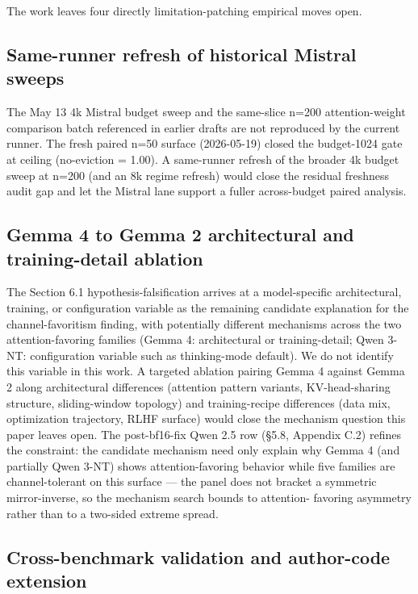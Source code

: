 \documentclass[10pt]{article}
\begin{document}
The work leaves four directly limitation-patching empirical moves open.

\subsection{Same-runner refresh of historical Mistral sweeps}\label{81-same-runner-refresh-of-historical-mistral-sweeps}

The May 13 4k Mistral budget sweep and the same-slice n=200
attention-weight comparison batch referenced in earlier drafts are not
reproduced by the current runner. The fresh paired n=50 surface
(2026-05-19) closed the budget-1024 gate at ceiling (no-eviction = 1.00).
A same-runner refresh of the broader 4k budget sweep at n=200 (and an
8k regime refresh) would close the residual freshness audit gap and let
the Mistral lane support a fuller across-budget paired analysis.

\subsection{Gemma 4 to Gemma 2 architectural and training-detail ablation}\label{82-gemma-4-to-gemma-2-architectural-and-training-detail-ablation}

The Section 6.1 hypothesis-falsification arrives at a model-specific
architectural, training, or configuration variable as the remaining
candidate explanation for the channel-favoritism finding, with
potentially different mechanisms across the two attention-favoring
families (Gemma 4: architectural or training-detail; Qwen 3-NT:
configuration variable such as thinking-mode default). We do not identify this
variable in this work. A targeted ablation pairing Gemma 4 against Gemma
2 along architectural differences (attention pattern variants,
KV-head-sharing structure, sliding-window topology) and training-recipe
differences (data mix, optimization trajectory, RLHF surface) would
close the mechanism question this paper leaves open. The post-bf16-fix
Qwen 2.5 row (\S{}5.8, Appendix C.2) refines the constraint: the
candidate mechanism need only explain why Gemma 4 (and partially Qwen
3-NT) shows attention-favoring behavior while five families are
channel-tolerant on this surface --- the panel does not bracket a
symmetric mirror-inverse, so the mechanism search bounds to attention-
favoring asymmetry rather than to a two-sided extreme spread.

\subsection{Cross-benchmark validation and author-code extension}\label{83-cross-benchmark-validation-and-author-code-extension}
\end{document}
